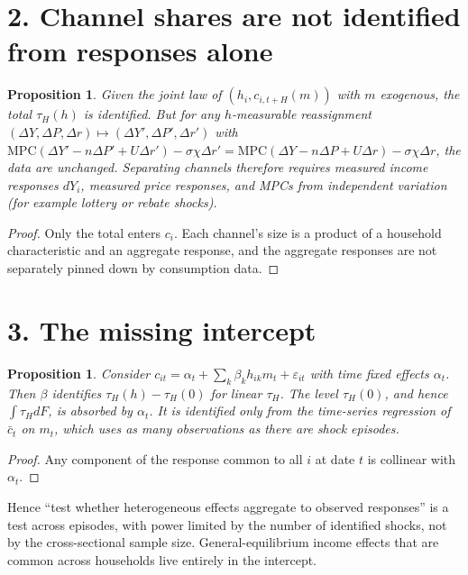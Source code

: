 \documentclass[11pt]{article}
\newtheorem{proposition}[theorem]{Proposition}
\theoremstyle{definition}
\begin{document}
\section*{2. Channel shares are not identified from responses alone}
\begin{proposition}\label{prop:oe}
Given the joint law of $(h_i,c_{i,t+H}(m))$ with $m$ exogenous, the total $\tau_H(h)$ is identified. But for any $h$-measurable
reassignment $(\Delta Y,\Delta P,\Delta r)\mapsto(\Delta Y',\Delta P',\Delta r')$ with
$\mathrm{MPC}(\Delta Y'-n\Delta P'+U\Delta r')-\sigma\chi\Delta r'=\mathrm{MPC}(\Delta Y-n\Delta P+U\Delta r)-\sigma\chi\Delta r$,
the data are unchanged. Separating channels therefore requires measured income responses $dY_i$, measured price responses,
and MPCs from independent variation (for example lottery or rebate shocks).
\end{proposition}
\begin{proof}
Only the total enters $c_i$. Each channel's size is a product of a household characteristic and an aggregate response, and
the aggregate responses are not separately pinned down by consumption data.
\end{proof}

\section*{3. The missing intercept}
\begin{proposition}\label{prop:intercept}
Consider $c_{it}=\alpha_t+\sum_k\beta_kh_{ik}m_t+\varepsilon_{it}$ with time fixed effects $\alpha_t$. Then $\beta$ identifies
$\tau_H(h)-\tau_H(0)$ for linear $\tau_H$. The level $\tau_H(0)$, and hence $\int\tau_HdF$, is absorbed by $\alpha_t$. It is
identified only from the time-series regression of $\bar c_t$ on $m_t$, which uses as many observations as there are shock
episodes.
\end{proposition}
\begin{proof}
Any component of the response common to all $i$ at date $t$ is collinear with $\alpha_t$.
\end{proof}
Hence ``test whether heterogeneous effects aggregate to observed responses'' is a test across episodes, with power limited
by the number of identified shocks, not by the cross-sectional sample size. General-equilibrium income effects that are
common across households live entirely in the intercept.
\end{document}
